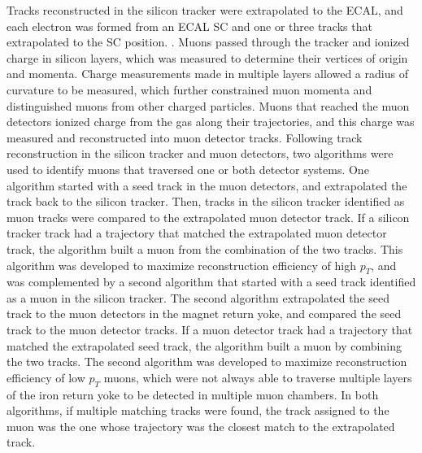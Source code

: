 Tracks reconstructed in the 
silicon tracker were extrapolated to the ECAL, and each electron was formed from an ECAL SC and one 
or three tracks that extrapolated to the SC position.  .
Muons passed through the tracker and ionized charge in silicon layers, which was measured to determine 
their vertices of origin and momenta.  Charge measurements made in multiple layers allowed a radius of 
curvature to be measured, which further constrained muon momenta and distinguished muons from other charged 
particles.  Muons that reached the muon detectors ionized charge from the gas along their trajectories, 
and this charge was measured and reconstructed into muon detector tracks.  Following track reconstruction 
in the silicon tracker and muon detectors, two algorithms \cite{cmsMuonRecoRunOne} were used to identify muons that traversed 
one or both detector systems.  One algorithm started with a seed track in the muon detectors, and 
extrapolated the track back to the silicon tracker.  Then, tracks in the silicon tracker identified as 
muon tracks were compared to the extrapolated muon detector track.  If a silicon tracker track had a 
trajectory that matched the extrapolated muon detector track, the algorithm built a muon from the 
combination of the two tracks.  This algorithm was developed to maximize reconstruction efficiency of 
high $p_{T}$, and was complemented by a second algorithm that started with a seed track identified as a 
muon in the silicon tracker.  The second algorithm extrapolated the seed track to the muon detectors in 
the magnet return yoke, and compared the seed track to the muon detector tracks.  If a muon detector track 
had a trajectory that matched the extrapolated seed track, the algorithm built a muon by combining the two 
tracks.  The second algorithm was developed to maximize reconstruction efficiency of low $p_{T}$ muons, which 
were not always able to traverse multiple layers of the iron return yoke to be detected in multiple 
muon chambers.  In both algorithms, if multiple matching tracks were found, the track assigned to the muon 
was the one whose trajectory was the closest match to the extrapolated track.




